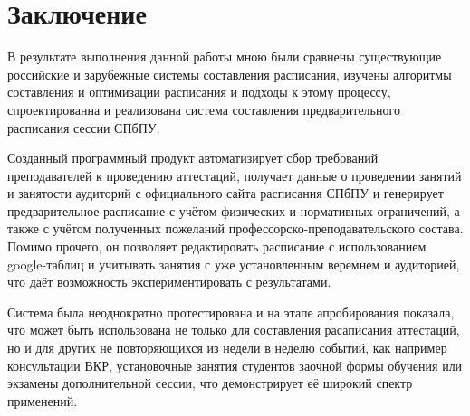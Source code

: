 \chapter*{Заключение} \label{ch-conclusion}

В результате выполнения данной работы мною были сравнены существующие российские и зарубежные системы составления расписания, изучены алгоритмы составления и оптимизации расписания и подходы к этому процессу, спроектированна и реализована система составления предварительного расписания сессии СПбПУ. 

Созданный программный продукт автоматизирует сбор требований преподавателей к проведению аттестаций, получает данные о проведении занятий и занятости аудиторий с официального сайта расписания СПбПУ и генерирует предварительное расписание с учётом физических и нормативных ограничений, а также с учётом полученных пожеланий профессорско-преподавательского состава. Помимо прочего, он позволяет редактировать расписание с использованием google-таблиц и учитывать занятия с уже установленным веремнем и аудиторией, что даёт возможность экспериментировать с результатами.

Система была неоднократно протестирована и на этапе апробирования показала, что может быть использована не только для составления расаписания аттестаций, но и для других не повторяющихся из недели в неделю событий, как например консультации ВКР, установочные занятия студентов заочной формы обучения или экзамены дополнительной сессии, что демонстрирует её широкий спектр применений.